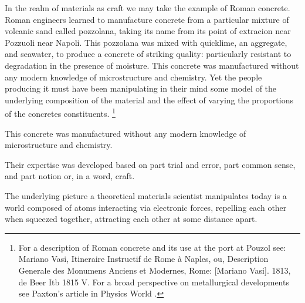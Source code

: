 In the realm of materials as craft we may take the example of Roman concrete.
%
Roman engineers learned to manufacture concrete from a 
particular mixture of volcanic sand called pozzolana,
taking its name from its point of extracion near Pozzuoli near Napoli. 
%
This pozzolana was mixed with quicklime, an aggregate, and seawater,
to produce a concrete of striking quality: 
particularly resistant to degradation in the presence of moisture.
This concrete was manufactured without any modern knowledge of microstructure 
and chemistry. Yet the people producing it must have been manipulating in their
mind some model of the underlying composition of the material and the effect of 
varying the proportions of the concretes constituents. 
%
%
\footnote{For a description of Roman concrete and its use at the port at Pouzol see: Mariano Vasi, 
Itineraire Instructif de Rome à Naples, ou, Description Generale des Monumens Anciens et Modernes, 
Rome: [Mariano Vasi]. 1813, de Beer Itb 1815 V. For a broad perspective on metallurgical developments
see Paxton's article in Physics World \cite{paxton92}.} 

This concrete was manufactured without any modern knowledge of microstructure and 
chemistry.
%

Their expertise was developed based on part trial and error, 
part common sense, and part notion or, in a word, craft.

The underlying picture a theoretical materials scientist manipulates today
is a world composed of atoms interacting via electronic forces,
repelling each other when squeezed together, attracting each other at some
distance apart. 

